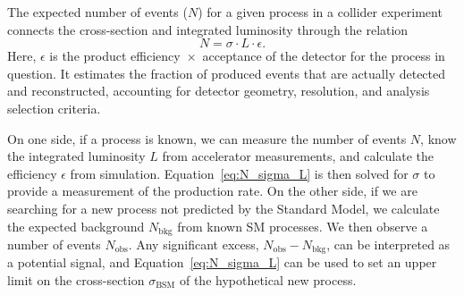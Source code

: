 The expected number of events ($N$) for a given process in a collider experiment connects the cross-section and integrated luminosity through the relation
\begin{equation}
N = \sigma \cdot L \cdot \epsilon.
\label{eq:N_sigma_L}
\end{equation}
Here, $\epsilon$ is the product efficiency~$\times$~acceptance of the detector for the process in question. It estimates the fraction of produced events that are actually detected and reconstructed, accounting for detector geometry, resolution, and analysis selection criteria.

On one side, if a process is known, we can measure the number of events $N$, know the integrated luminosity $L$ from accelerator measurements, and calculate the efficiency $\epsilon$ from simulation. Equation~\ref{eq:N_sigma_L} is then solved for $\sigma$ to provide a measurement of the production rate. On the other side, if we are searching for a new process not predicted by the Standard Model, we calculate the expected background $N_\text{bkg}$ from known SM processes. We then observe a number of events $N_\text{obs}$. Any significant excess, $N_\text{obs} - N_\text{bkg}$, can be interpreted as a potential signal, and Equation~\ref{eq:N_sigma_L} can be used to set an upper limit on the cross-section $\sigma_\text{BSM}$ of the hypothetical new process.


